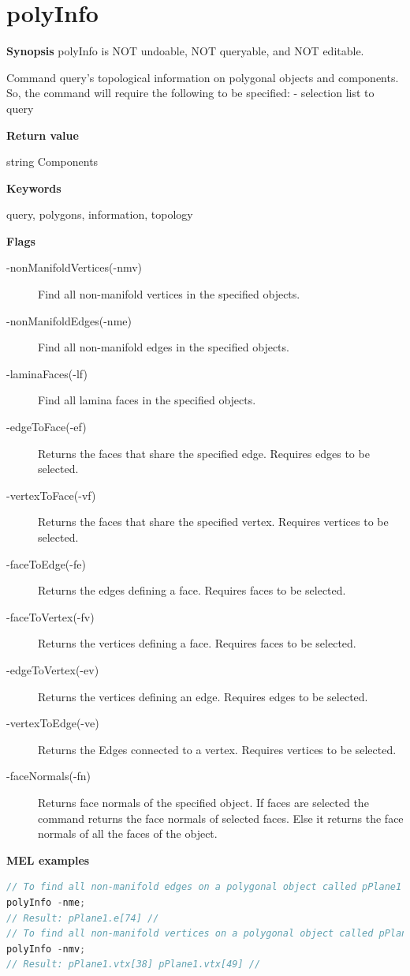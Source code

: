 \section{polyInfo}
\textbf{Synopsis}
polyInfo is NOT undoable, NOT queryable, and NOT editable.

Command query's topological information on polygonal objects and components. So, the command will require the following to be specified: - selection list to query


\textbf{Return value}

string	Components


\textbf{Keywords}

query, polygons, information, topology


\textbf{Flags}
\begin{description}
	\item[-nonManifoldVertices(-nmv)	] Find all non-manifold vertices in the specified objects.
	\item[-nonManifoldEdges(-nme)] Find all non-manifold edges in the specified objects.
	\item[-laminaFaces(-lf)] Find all lamina faces in the specified objects.
	\item[-edgeToFace(-ef)] Returns the faces that share the specified edge. Requires edges to be selected.
	\item[-vertexToFace(-vf)] Returns the faces that share the specified vertex. Requires vertices to be selected.
	\item[-faceToEdge(-fe)] Returns the edges defining a face. Requires faces to be selected.
	\item[-faceToVertex(-fv)] Returns the vertices defining a face. Requires faces to be selected.
	\item[-edgeToVertex(-ev)] Returns the vertices defining an edge. Requires edges to be selected.
	\item[-vertexToEdge(-ve)] Returns the Edges connected to a vertex. Requires vertices to be selected.
	\item[-faceNormals(-fn)] Returns face normals of the specified object. If faces are selected the command returns the face normals of selected faces. Else it returns the face normals of all the faces of the object.
\end{description}

\textbf{MEL examples}
\begin{lstlisting}[language=C++]
// To find all non-manifold edges on a polygonal object called pPlane1
polyInfo -nme;
// Result: pPlane1.e[74] //
// To find all non-manifold vertices on a polygonal object called pPlane1
polyInfo -nmv;
// Result: pPlane1.vtx[38] pPlane1.vtx[49] //
\end{lstlisting}

